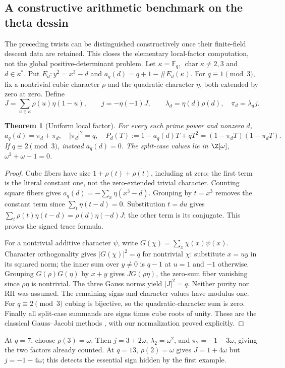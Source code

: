 \documentclass[11pt]{article}
\newtheorem{theorem}{Theorem}[section]
\theoremstyle{definition}\newtheorem{definition}[theorem]{Definition}
\theoremstyle{remark}\newtheorem{remark}[theorem]{Remark}
\begin{document}
\subsection{A constructive arithmetic benchmark on the theta dessin}
The preceding twists can be distinguished constructively once their finite-field descent data are retained. This closes the elementary local-factor computation, not the global positive-determinant problem. Let $\kappa=\mathbb F_q$, $\operatorname{char}\kappa\ne2,3$ and $d\in\kappa^*$. Put $E_d:y^2=x^3-d$ and $a_q(d)=q+1-\#E_d(\kappa)$. For $q\equiv1\pmod3$, fix a nontrivial cubic character $\rho$ and the quadratic character $\eta$, both extended by zero at zero. Define
\[
 J=\sum_{u\in\kappa}\rho(u)\eta(1-u),\qquad
 j=-\eta(-1)J,\qquad \lambda_d=\eta(d)\rho(d),\quad \pi_d=\lambda_dj.
\]
\begin{theorem}[Uniform local factor]\label{thm:jacobitheta}
For every such prime power and nonzero $d$,
\[
 a_q(d)=\pi_d+\overline{\pi_d},\quad |\pi_d|^2=q,\quad
 P_d(T):=1-a_q(d)T+qT^2=(1-\pi_dT)(1-\overline{\pi_d}T).
\]
If $q\equiv2\pmod3$, instead $a_q(d)=0$. The split-case values lie in $\Z[\omega]$, $\omega^2+\omega+1=0$.
\end{theorem}
\begin{proof}
Cube fibers have size $1+\rho(t)+\overline{\rho(t)}$, including at zero; the first term is the literal constant one, not the zero-extended trivial character. Counting square fibers gives $a_q(d)=-\sum_x\eta(x^3-d)$. Grouping by $t=x^3$ removes the constant term since $\sum_t\eta(t-d)=0$. Substitution $t=du$ gives $\sum_t\rho(t)\eta(t-d)=\rho(d)\eta(-d)J$; the other term is its conjugate. This proves the signed trace formula.

For a nontrivial additive character $\psi$, write $G(\chi)=\sum_x\chi(x)\psi(x)$. Character orthogonality gives $|G(\chi)|^2=q$ for nontrivial $\chi$: substitute $x=uy$ in its squared norm; the inner sum over $y\ne0$ is $q-1$ at $u=1$ and $-1$ otherwise. Grouping $G(\rho)G(\eta)$ by $x+y$ gives $JG(\rho\eta)$, the zero-sum fiber vanishing since $\rho\eta$ is nontrivial. The three Gauss norms yield $|J|^2=q$. Neither purity nor RH was assumed. The remaining signs and character values have modulus one. For $q\equiv2\pmod3$ cubing is bijective, so the quadratic-character sum is zero. Finally all split-case summands are signs times cube roots of unity. These are the classical Gauss--Jacobi methods \cite[pp.499--502]{WeilJacobi}, with our normalization proved explicitly.
\end{proof}
At $q=7$, choose $\rho(3)=\omega$. Then $j=3+2\omega$, $\lambda_2=\omega^2$, and $\pi_2=-1-3\omega$, giving the two factors already counted. At $q=13$, $\rho(2)=\omega$ gives $J=1+4\omega$ but $j=-1-4\omega$; this detects the essential sign hidden by the first example.
\end{document}
